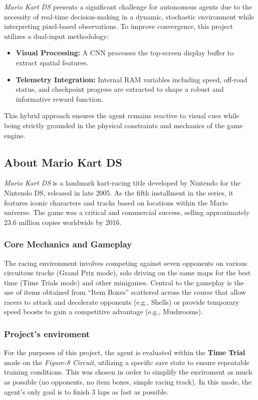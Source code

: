 \documentclass[11pt,a4paper]{article}
\begin{document}
\textit{Mario Kart DS} presents a significant challenge for autonomous agents due to the necessity of real-time decision-making in a dynamic, stochastic environment while interpreting pixel-based observations. To improve convergence, this project utilizes a dual-input methodology:
\begin{itemize}
    \item \textbf{Visual Processing:} A CNN processes the top-screen display buffer to extract spatial features.
    \item \textbf{Telemetry Integration:} Internal RAM variables including speed, off-road status, and checkpoint progress are extracted to shape a robust and informative reward function.
\end{itemize}
This hybrid approach ensures the agent remains reactive to visual cues while being strictly grounded in the physical constraints and mechanics of the game engine.

\subsection{About Mario Kart DS}
\textit{Mario Kart DS} is a landmark kart-racing title developed by Nintendo for the Nintendo DS, released in late 2005. As the fifth installment in the series, it features iconic characters and tracks based on locations within the Mario universe. The game was a critical and commercial success, selling approximately 23.6 million copies worldwide by 2016.

\subsubsection{Core Mechanics and Gameplay}
The racing environment involves competing against seven opponents on various circuitous tracks (Grand Prix mode), solo driving on the same maps for the best time (Time Trials mode) and other minigames. Central to the gameplay is the use of items obtained from ``Item Boxes'' scattered across the course that allow racers to attack and decelerate opponents (e.g., Shells) or provide temporary speed boosts to gain a competitive advantage (e.g., Mushrooms).

\subsubsection{Project's enviroment}
For the purposes of this project, the agent is evaluated within the \textbf{Time Trial} mode on the \textit{Figure-8 Circuit}, utilizing a specific save state to ensure repeatable training conditions. This was chosen in order to simplify the enviroment as much as possible (no opponents, no item boxes, simple racing track). In this mode, the agent's only goal is to finish 3 laps as fast as possible.
\end{document}
